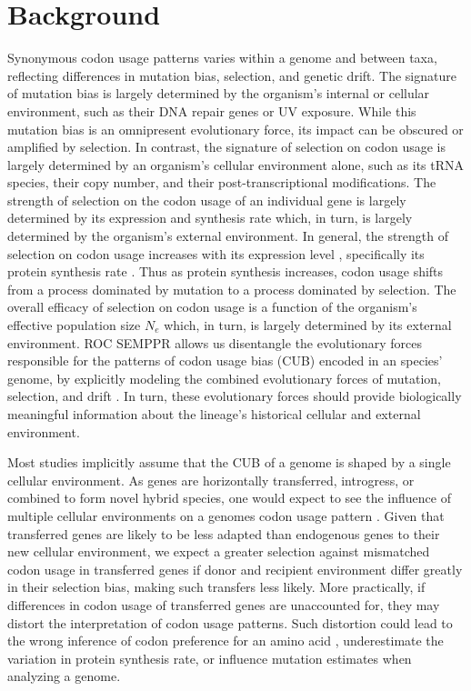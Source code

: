 \documentclass{bmcart}
\newcommand{\ROC}{ROC SEMPPR\xspace}
\newcommand{\Ne}{\ensuremath{N_e}\xspace}
\begin{document}
\section*{Background}
Synonymous codon usage patterns varies within a genome and between taxa, reflecting differences in mutation bias, selection, and genetic drift.
The signature of mutation bias is largely determined by the organism's internal or cellular environment, such as their DNA repair genes or UV exposure.
While this mutation bias is an omnipresent evolutionary force, its impact can be obscured or amplified by selection. 
In contrast, the signature of selection on codon usage is largely determined by an organism's cellular environment alone, such as its tRNA species, their copy number, and their post-transcriptional modifications.
The strength of selection on the codon usage of an individual gene is largely determined by its expression and synthesis rate which, in turn, is largely determined by the organism's external environment.
In general, the strength of selection on codon usage increases with its expression level \citep{gouy1982, ikemura1985, bulmer1990}, specifically its protein synthesis rate \citep{gilchrist2007}.
Thus as protein synthesis increases, codon usage shifts from a process dominated by mutation to a process dominated by selection.
The overall efficacy of selection on codon usage is a function of the organism's effective population size $\Ne$ which, in turn, is largely determined by its external environment.
\ROC allows us disentangle the evolutionary forces responsible for the patterns of codon usage bias (CUB) encoded in an species' genome, by explicitly modeling the combined evolutionary forces of mutation, selection, and drift \citep{gilchrist2007, ShahAndGilchrist2011, wallace2013, gilchrist2015}.
In turn, these evolutionary forces should provide biologically meaningful information about the lineage's historical cellular and external environment.

Most studies implicitly assume that the CUB of a genome is shaped by a single cellular environment. 
As genes are horizontally transferred, introgress, or combined to form novel hybrid species, one would expect to see the influence of multiple cellular environments on a genomes codon usage pattern \citep{medigue1991, lawrence1997}.
Given that transferred genes are likely to be less adapted than endogenous genes to their new cellular environment, we expect a greater selection against mismatched codon usage in transferred genes if donor and recipient environment differ greatly in their selection bias, making such transfers less likely.
More practically, if differences in codon usage of transferred genes are unaccounted for, they may distort the interpretation of codon usage patterns.
Such distortion could lead to the wrong inference of codon preference for an amino acid \citep{ShahAndGilchrist2011, gilchrist2015}, underestimate the variation in protein synthesis rate, or influence mutation estimates when analyzing a genome.
\end{document}
